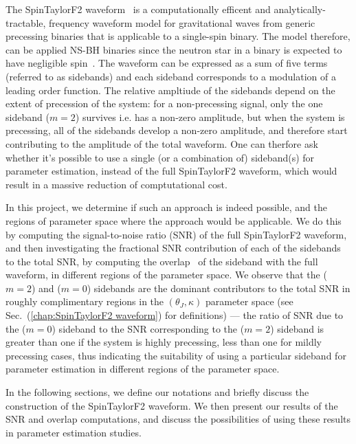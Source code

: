 The SpinTaylorF2 waveform~\cite{Lundgren2014} is a computationally efficent and
analytically-tractable, frequency waveform model for gravitational waves from
generic precessing binaries that is applicable to a single-spin binary. The
model therefore, can be applied NS-BH binaries since the neutron star in a
binary is expected to have negligible spin~\cite{NSBH_upperlims, Brown2012,
Kramer}. The waveform can be expressed as a sum of five terms (referred to as
sidebands) and each sideband corresponds to a modulation of a leading order
function. The relative ampltiude of the sidebands depend on the extent of
precession of the system: for a non-precessing signal,  only the one sideband
($m=2$) survives i.e. has a non-zero amplitude, but when the system is
precessing, all of the sidebands develop a non-zero amplitude, and therefore
start contributing to the amplitude of the total waveform. One can therfore ask
whether it's possible to use a single (or a combination of) sideband(s) for
parameter estimation, instead of the full SpinTaylorF2 waveform, which would
result in  a massive reduction of comptutational cost.

In this project, we determine if such an approach is indeed possible, and the
regions of  parameter space where the approach would be applicable. We do this
by computing the signal-to-noise ratio (SNR) of the full SpinTaylorF2 waveform,
and then investigating the fractional SNR contribution of each of the sidebands
to the total SNR, by computing the overlap~\cite{Creighton} of  the sideband
with the full waveform, in different regions of the parameter space. We observe
that the ($m=2$) and ($m=0$) sidebands are the dominant contributors to the
total SNR in roughly complimentary regions in the $(\theta_J, \kappa)$ parameter
space (see Sec.~(\ref{chap:SpinTaylorF2 waveform}) for definitions) --- the
ratio of  SNR due to the ($m=0$) sideband to the SNR corresponding to the
($m=2$) sideband is  greater than one if the system is highly precessing, less
than one for  mildly precessing cases, thus indicating the suitability of using
a particular sideband for parameter estimation in different regions of the
parameter space.

In the following sections, we define our notations and briefly discuss the
construction  of the SpinTaylorF2 waveform. We then present our results of the
SNR and overlap computations, and discuss the possibilities of using these
results in parameter estimation studies.

